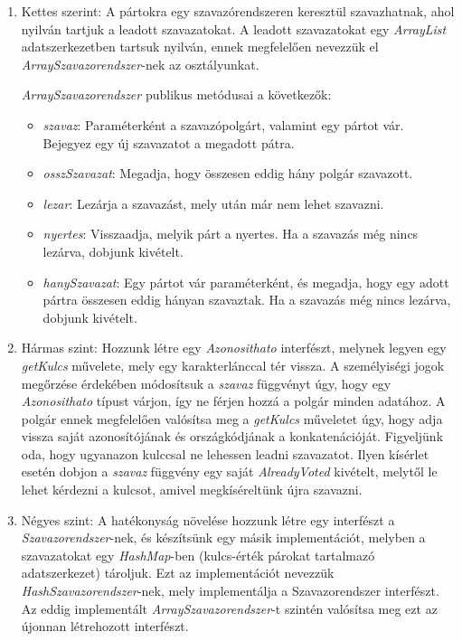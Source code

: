 \documentclass[12pt,a4paper]{article}
\begin{document}
\begin{enumerate}


\item Kettes szerint: A pártokra egy szavazórendszeren keresztül szavazhatnak, 
ahol nyilván tartjuk a leadott szavazatokat. A leadott szavazatokat egy 
\textit{ArrayList} adatszerkezetben tartsuk nyilván, ennek megfelelően nevezzük 
el \textit{ArraySzavazorendszer}-nek az osztályunkat.

\textit{ArraySzavazorendszer} publikus metódusai a következők:
\begin{itemize}
\item \textit{szavaz}: Paraméterként a szavazópolgárt, valamint egy pártot vár. 
Bejegyez egy új szavazatot a megadott pátra.
\item \textit{osszSzavazat}: Megadja, hogy összesen eddig hány polgár szavazott.
\item \textit{lezar}: Lezárja a szavazást, mely után már nem lehet szavazni.
\item \textit{nyertes}: Visszaadja, melyik párt a nyertes. Ha a szavazás még 
nincs lezárva, dobjunk kivételt.
\item \textit{hanySzavazat}: Egy pártot vár paraméterként, és megadja, hogy egy 
adott pártra összesen eddig hányan szavaztak. Ha a szavazás még nincs lezárva, dobjunk kivételt.
\end{itemize}


\item Hármas szint: Hozzunk létre egy \textit{Azonosithato} interfészt, melynek 
legyen egy \textit{getKulcs} művelete, mely egy karakterlánccal tér vissza. 
A személyiségi jogok megőrzése érdekében módosítsuk a \textit{szavaz} függvényt 
úgy, hogy egy \textit{Azonosithato} típust várjon, így ne férjen hozzá a polgár 
minden adatához. A polgár ennek megfelelően valósítsa meg a \textit{getKulcs} 
műveletet úgy, hogy adja vissza saját azonosítójának és országkódjának a 
konkatenációját. Figyeljünk oda, hogy ugyanazon kulccsal ne lehessen leadni 
szavazatot. Ilyen kísérlet esetén dobjon a \textit{szavaz} függvény egy saját 
\textit{AlreadyVoted} kivételt, melytől le lehet kérdezni a kulcsot, amivel 
megkíséreltünk újra szavazni.

\item Négyes szint: A hatékonyság növelése hozzunk létre egy interfészt a 
\textit{Szavazorendszer}-nek, és készítsünk egy másik implementációt, melyben 
a szavazatokat egy \textit{HashMap}-ben (kulcs-érték párokat tartalmazó adatszerkezet) 
tároljuk. Ezt az implementációt nevezzük \textit{HashSzavazorendszer}-nek, mely 
implementálja a Szavazorendszer interfészt. Az eddig implementált 
\textit{ ArraySzavazorendszer}-t szintén valósítsa meg ezt az újonnan létrehozott interfészt.


\end{enumerate}
\end{document}
